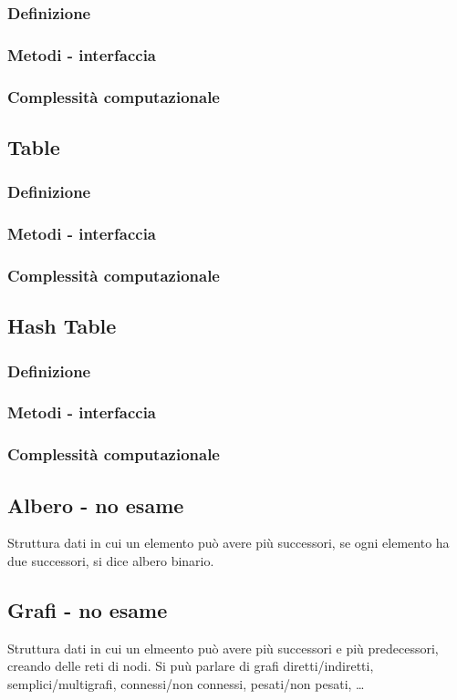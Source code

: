 \documentclass{article}
\begin{document}
\subsubsection*{Definizione}
\subsubsection*{Metodi - interfaccia}
\subsubsection*{Complessità computazionale}

\subsection{Table}
\subsubsection*{Definizione}
\subsubsection*{Metodi - interfaccia}
\subsubsection*{Complessità computazionale}

\subsection{Hash Table}
\subsubsection*{Definizione}
\subsubsection*{Metodi - interfaccia}
\subsubsection*{Complessità computazionale}

\newpage

\subsection{Albero - no esame}
Struttura dati in cui un elemento può avere più successori, se ogni elemento ha due successori, si dice albero binario.

\subsection{Grafi - no esame}
Struttura dati in cui un elmeento può avere più successori e più predecessori, creando delle reti di nodi.
Si puù parlare di grafi diretti/indiretti, semplici/multigrafi, connessi/non connessi, pesati/non pesati, \dots
\end{document}
